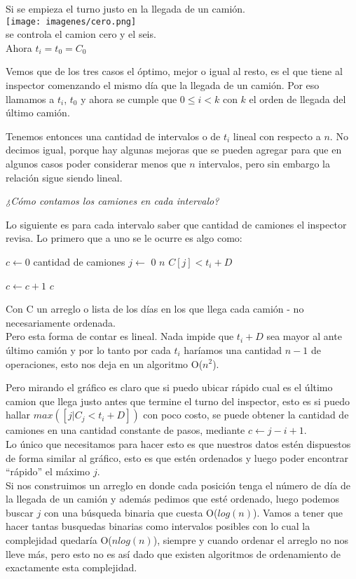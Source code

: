 \documentclass[11pt,a4paper]{article}
\begin{document}
Si se empieza el turno justo en la llegada de un camión.\\
\texttt{[image: imagenes/cero.png]}\\
se controla el camion cero y el seis.\\
Ahora $t_i = t_0 = C_0$

Vemos que de los tres casos el óptimo, mejor o igual al resto, es el que tiene al inspector comenzando el mismo día que la llegada de un camión. Por eso llamamos a $t_i$, $t_0$ y ahora se cumple que $0 \le i < k$ con $k$ el orden de llegada del último camión.

Tenemos entonces una cantidad de intervalos o de $t_i$ lineal con respecto a $n$. No decimos igual, porque hay algunas mejoras que se pueden agregar para que en algunos casos poder considerar menos que $n$ intervalos, pero sin embargo la relación sigue siendo lineal.

\emph{¿Cómo contamos los camiones en cada intervalo?}

Lo siguiente es para cada intervalo saber que cantidad de camiones el inspector revisa. Lo primero que a uno se le ocurre es algo como:

\begin{codebox}
\zi $c \gets 0$
\RComment cantidad de camiones
\zi \For $j \gets$ 0 \To $n$
\zi \Do
\zi   \If $C[j] < t_i + D$ 

\zi
\Then $c \gets c + 1$
\End
\End
\zi
\Return $c$
\end{codebox}

Con C un arreglo o lista de los días en los que llega cada camión - no necesariamente ordenada.\\
Pero esta forma de contar es lineal. Nada impide que $t_i + D$ sea mayor al ante último camión y por lo tanto por cada $t_i$ haríamos una cantidad $n - 1$ de operaciones, esto nos deja en un algoritmo O($n^2$).

Pero mirando el gráfico es claro que si puedo ubicar rápido cual es el último camion que llega justo antes que termine el turno del inspector, esto es si puedo hallar $max([j | C_j < t_i + D])$ con poco costo, se puede obtener la cantidad de camiones en una cantidad constante de pasos, mediante $c \gets j - i + 1$.\\
Lo único que necesitamos para hacer esto es que nuestros datos estén dispuestos de forma similar al gráfico, esto es que estén ordenados y luego poder encontrar ``rápido'' el máximo $j$.\\

Si nos construimos un arreglo en donde cada posición tenga el número de día de la llegada de un camión y además pedimos que esté ordenado, luego podemos buscar $j$ con una búsqueda binaria que cuesta O($log(n)$). Vamos a tener que hacer tantas busquedas binarias como intervalos posibles con lo cual la complejidad quedaría O($nlog(n)$), siempre y cuando ordenar el arreglo no nos lleve más, pero esto no es así dado que existen algoritmos de ordenamiento de exactamente esta complejidad.
\end{document}
